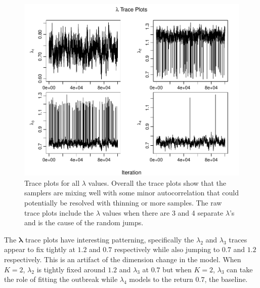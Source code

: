\documentclass[11pt,a4paper]{article}
\numberwithin{equation}{section}
\begin{document}
\begin{figure}

{\centering \includegraphics[height=0.41\textheight]{thesis_draft_files/figure-latex/unnamed-chunk-4-1} 

}

\caption{Trace plots for all $\lambda$ values. Overall the trace plots show that the samplers are mixing well with some minor autocorrelation that could potentially be resolved with thinning or more samples. The raw trace plots include the $\lambda$ values when there are 3 and 4 separate $\lambda$'s and is the cause of the random jumps.}\label{fig:unnamed-chunk-4}
\end{figure}

The \(\boldsymbol{\lambda}\) trace plots have interesting patterning,
specifically the \(\lambda_2\) and \(\lambda_3\) traces appear to fix
tightly at \(1.2\) and \(0.7\) respectively while also jumping to
\(0.7\) and \(1.2\) respectively. This is an artifact of the dimension
change in the model. When \(K = 2\), \(\lambda_2\) is tightly fixed
around \(1.2\) and \(\lambda_3\) at \(0.7\) but when \(K = 2\),
\(\lambda_3\) can take the role of fitting the outbreak while
\(\lambda_4\) models to the return \(0.7\), the baseline.
\end{document}

